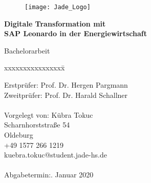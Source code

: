 \begin{titlepage}
  \begin{centering}
  \begin{figure}[h!]
    \centering
    \texttt{[image: Jade\_Logo]}
  \end{figure}



  \vspace*{0.4cm}

  \textsf{\Huge \textbf{Digitale Transformation mit \\ SAP Leonardo in der Energiewirtschaft\\}}

  \vspace*{0.5cm}
  \noindent Bachelorarbeit\\

  \end{centering}

  \vspace*{1.5cm}
  \begin{tabbing}
  xxxxxxxxxxxxxxxx\= \kill

  \small Erstprüfer:\> Prof. Dr. Hergen Pargmann\\
  \small Zweitprüfer:\> Prof. Dr. Harald Schallner\\\\

  \small Vorgelegt von: \>Kübra Tokuc\\
  \small \>Scharnhorststraße 54\\
  \small {} Oldeburg\\
  \small \>+49 1577 266 1219\\
  \small \>kuebra.tokuc@student.jade-hs.de\\\\

  \small Abgabetermin:. Januar 2020
  \end{tabbing}
\end{titlepage}
\newpage
